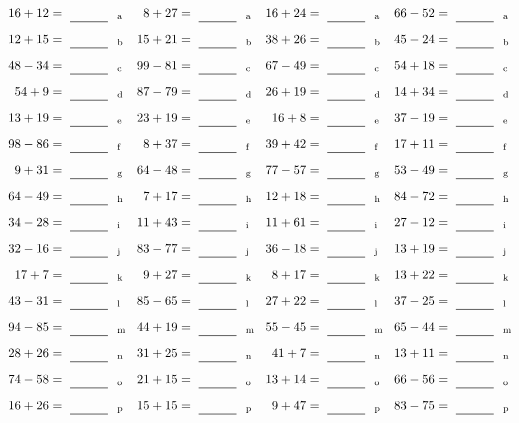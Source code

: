\documentclass
[
  draft    = true,
  fontsize = 11pt,
  parskip  = half-
]
{scrartcl}
\begin{document}
\clearpage
\begin{align*}
    \pline{16+12}&=\rline{a}
  & \pline{8+27}&=\rline{a}
  & \pline{16+24}&=\rline{a}
  & \pline{66-52}&=\rline{a} \\[1ex]
    \pline{12+15}&=\rline{b}
  & \pline{15+21}&=\rline{b}
  & \pline{38+26}&=\rline{b}
  & \pline{45-24}&=\rline{b} \\[1ex]
    \pline{48-34}&=\rline{c}
  & \pline{99-81}&=\rline{c}
  & \pline{67-49}&=\rline{c}
  & \pline{54+18}&=\rline{c} \\[1ex]
    \pline{54+9}&=\rline{d}
  & \pline{87-79}&=\rline{d}
  & \pline{26+19}&=\rline{d}
  & \pline{14+34}&=\rline{d} \\[1ex]
    \pline{13+19}&=\rline{e}
  & \pline{23+19}&=\rline{e}
  & \pline{16+8}&=\rline{e}
  & \pline{37-19}&=\rline{e} \\[1ex]
    \pline{98-86}&=\rline{f}
  & \pline{8+37}&=\rline{f}
  & \pline{39+42}&=\rline{f}
  & \pline{17+11}&=\rline{f} \\[1ex]
    \pline{9+31}&=\rline{g}
  & \pline{64-48}&=\rline{g}
  & \pline{77-57}&=\rline{g}
  & \pline{53-49}&=\rline{g} \\[1ex]
    \pline{64-49}&=\rline{h}
  & \pline{7+17}&=\rline{h}
  & \pline{12+18}&=\rline{h}
  & \pline{84-72}&=\rline{h} \\[1ex]
    \pline{34-28}&=\rline{i}
  & \pline{11+43}&=\rline{i}
  & \pline{11+61}&=\rline{i}
  & \pline{27-12}&=\rline{i} \\[1ex]
    \pline{32-16}&=\rline{j}
  & \pline{83-77}&=\rline{j}
  & \pline{36-18}&=\rline{j}
  & \pline{13+19}&=\rline{j} \\[1ex]
    \pline{17+7}&=\rline{k}
  & \pline{9+27}&=\rline{k}
  & \pline{8+17}&=\rline{k}
  & \pline{13+22}&=\rline{k} \\[1ex]
    \pline{43-31}&=\rline{l}
  & \pline{85-65}&=\rline{l}
  & \pline{27+22}&=\rline{l}
  & \pline{37-25}&=\rline{l} \\[1ex]
    \pline{94-85}&=\rline{m}
  & \pline{44+19}&=\rline{m}
  & \pline{55-45}&=\rline{m}
  & \pline{65-44}&=\rline{m} \\[1ex]
    \pline{28+26}&=\rline{n}
  & \pline{31+25}&=\rline{n}
  & \pline{41+7}&=\rline{n}
  & \pline{13+11}&=\rline{n} \\[1ex]
    \pline{74-58}&=\rline{o}
  & \pline{21+15}&=\rline{o}
  & \pline{13+14}&=\rline{o}
  & \pline{66-56}&=\rline{o} \\[1ex]
    \pline{16+26}&=\rline{p}
  & \pline{15+15}&=\rline{p}
  & \pline{9+47}&=\rline{p}
  & \pline{83-75}&=\rline{p}
\end{align*}
\end{document}
